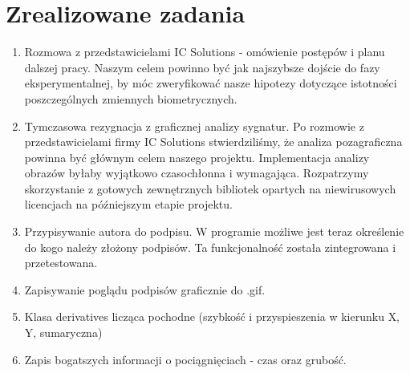 \documentclass{mwrep}
\begin{document}
{\let\clearpage\relax 
\chapter{Zrealizowane zadania}}
\begin{enumerate}
    \item Rozmowa z przedstawicielami IC Solutions - omówienie postępów i planu dalszej pracy. 
    Naszym celem powinno być jak najszybsze dojście do fazy eksperymentalnej, by móc zweryfikować nasze hipotezy dotyczące istotności poszczególnych zmiennych biometrycznych.
    \item Tymczasowa rezygnacja z graficznej analizy sygnatur. 
    Po rozmowie z przedstawicielami firmy IC Solutions stwierdziliśmy, że analiza pozagraficzna powinna być głównym celem naszego projektu. Implementacja analizy obrazów byłaby wyjątkowo czasochłonna i wymagająca. Rozpatrzymy skorzystanie z gotowych zewnętrznych bibliotek opartych na niewirusowych licencjach na późniejszym etapie projektu.
    \item Przypisywanie autora do podpisu. W programie możliwe jest teraz określenie do kogo należy złożony podpisów. Ta funkcjonalność została zintegrowana i przetestowana.
	\item Zapisywanie poglądu podpisów graficznie do .gif.
	\item Klasa derivatives licząca pochodne (szybkość i przyspieszenia w kierunku X, Y, sumaryczna)
	\item Zapis bogatszych informacji o pociągnięciach - czas oraz grubość.
	\end{enumerate}
\end{document}

